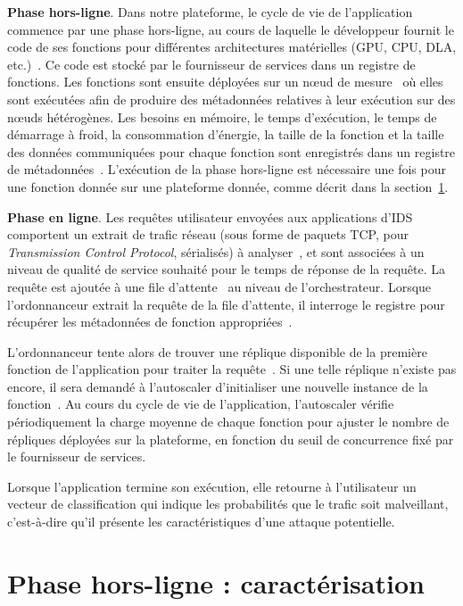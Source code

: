 \textbf{Phase hors-ligne}. Dans notre plateforme, le cycle de vie de l'application commence par une phase hors-ligne, au cours de laquelle le développeur fournit le code de ses fonctions pour différentes architectures matérielles (\gls{GPU}, \gls{CPU}, \gls{DLA}, etc.)~. Ce code est stocké par le fournisseur de services dans un registre de fonctions. Les fonctions sont ensuite déployées sur un nœud de mesure~ où elles sont exécutées afin de produire des métadonnées relatives à leur exécution sur des nœuds hétérogènes. Les besoins en mémoire, le temps d'exécution, le temps de démarrage à froid, la consommation d'énergie, la taille de la fonction et la taille des données communiquées pour chaque fonction sont enregistrés dans un registre de métadonnées~. L'exécution de la phase hors-ligne est nécessaire une fois pour une fonction donnée sur une plateforme donnée, comme décrit dans la section~\ref{section:herocache-workload}.

\textbf{Phase en ligne}. Les requêtes utilisateur envoyées aux applications d'\gls{IDS} comportent un extrait de trafic réseau (sous forme de paquets \gls{TCP}, pour \textit{Transmission Control Protocol}, sérialisés) à analyser~, et sont associées à un niveau de qualité de service souhaité pour le temps de réponse de la requête. La requête est ajoutée à une file d'attente~ au niveau de l'orchestrateur. Lorsque l'ordonnanceur extrait la requête de la file d'attente, il interroge le registre pour récupérer les métadonnées de fonction appropriées~.

L'ordonnanceur tente alors de trouver une réplique disponible de la première fonction de l'application pour traiter la requête~. Si une telle réplique n'existe pas encore, il sera demandé à l'autoscaler d'initialiser une nouvelle instance de la fonction~. Au cours du cycle de vie de l'application, l'autoscaler vérifie périodiquement la charge moyenne de chaque fonction pour ajuster le nombre de répliques déployées sur la plateforme, en fonction du seuil de concurrence fixé par le fournisseur de services.

Lorsque l'application termine son exécution, elle retourne à l'utilisateur un vecteur de classification qui indique les probabilités que le trafic soit malveillant, c'est-à-dire qu'il présente les caractéristiques d'une attaque potentielle.

\section{Phase hors-ligne : caractérisation} 
\label{section:herocache-workload}


